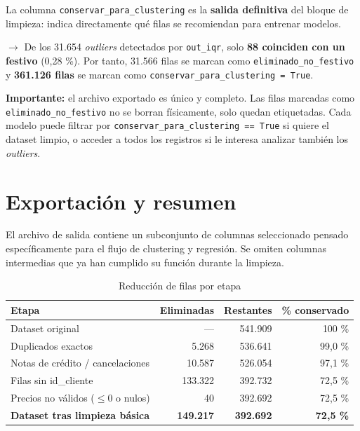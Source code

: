 \documentclass[11pt,a4paper]{article}
\begin{document}
La columna \texttt{conservar\_para\_clustering} es la \textbf{salida definitiva} del bloque de limpieza: indica directamente qué filas se recomiendan para entrenar modelos.

\noindent$\rightarrow$ De los 31.654 \textit{outliers} detectados por \texttt{out\_iqr}, solo \textbf{88 coinciden con un festivo} (0,28 \%). Por tanto, 31.566 filas se marcan como \texttt{eliminado\_no\_festivo} y \textbf{361.126 filas} se marcan como \texttt{conservar\_para\_clustering = True}.

\textbf{Importante:} el archivo exportado es único y completo. Las filas marcadas como \texttt{eliminado\_no\_festivo} no se borran físicamente, solo quedan etiquetadas. Cada modelo puede filtrar por \texttt{conservar\_para\_clustering == True} si quiere el dataset limpio, o acceder a todos los registros si le interesa analizar también los \textit{outliers}.

\section{Exportación y resumen}

El archivo de salida contiene un subconjunto de columnas seleccionado pensado específicamente para el flujo de clustering y regresión. Se omiten columnas intermedias que ya han cumplido su función durante la limpieza.

\begin{table}[h]
\centering
\caption{Reducción de filas por etapa}
\begin{tabular}{lrrr}
\toprule
\textbf{Etapa} & \textbf{Eliminadas} & \textbf{Restantes} & \textbf{\% conservado} \\
\midrule
Dataset original & --- & 541.909 & 100 \% \\
Duplicados exactos & 5.268 & 536.641 & 99,0 \% \\
Notas de crédito / cancelaciones & 10.587 & 526.054 & 97,1 \% \\
Filas sin id\_cliente & 133.322 & 392.732 & 72,5 \% \\
Precios no válidos ($\leq 0$ o nulos) & 40 & 392.692 & 72,5 \% \\
\midrule
\textbf{Dataset tras limpieza básica} & \textbf{149.217} & \textbf{392.692} & \textbf{72,5 \%} \\
\bottomrule
\end{tabular}
\end{table}
\end{document}
